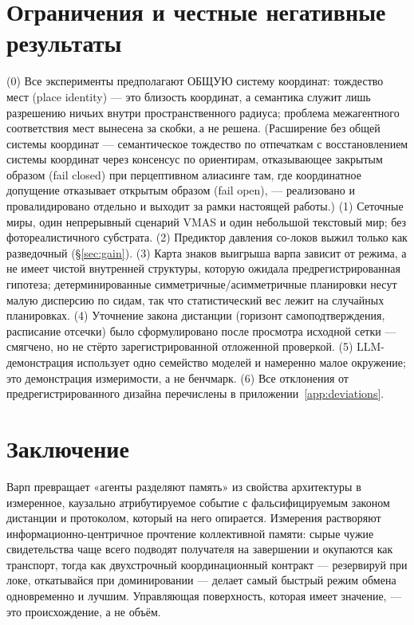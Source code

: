 \documentclass{article}
\begin{document}
\section{Ограничения и честные негативные результаты}
\label{sec:limits}

(0) Все эксперименты предполагают ОБЩУЮ систему координат: тождество
мест (place identity) --- это близость координат, а семантика служит
лишь разрешению ничьих внутри пространственного радиуса; проблема
межагентного соответствия мест вынесена за скобки, а не решена.
(Расширение без общей системы координат --- семантическое тождество
по отпечаткам с восстановлением системы координат через консенсус по
ориентирам, отказывающее закрытым образом (fail closed) при
перцептивном алиасинге там, где координатное допущение отказывает
открытым образом (fail open), --- реализовано и провалидировано
отдельно и выходит за рамки настоящей работы.) (1) Сеточные миры,
один непрерывный сценарий VMAS и один небольшой текстовый мир; без
фотореалистичного субстрата. (2) Предиктор давления со-локов выжил
только как разведочный (\S\ref{sec:gain}). (3) Карта знаков выигрыша
варпа зависит от режима, а не имеет чистой внутренней структуры,
которую ожидала предрегистрированная гипотеза; детерминированные
симметричные/асимметричные планировки несут малую дисперсию по сидам,
так что статистический вес лежит на случайных планировках. (4)
Уточнение закона дистанции (горизонт самоподтверждения, расписание
отсечки) было сформулировано после просмотра исходной сетки ---
смягчено, но не стёрто зарегистрированной отложенной проверкой. (5)
LLM-демонстрация использует одно семейство моделей и намеренно малое
окружение; это демонстрация измеримости, а не бенчмарк. (6) Все
отклонения от предрегистрированного дизайна перечислены в
приложении~\ref{app:deviations}.

\section{Заключение}

Варп превращает «агенты разделяют память» из свойства архитектуры в
измеренное, каузально атрибутируемое событие с фальсифицируемым
законом дистанции и протоколом, который на него опирается. Измерения
растворяют информационно-центричное прочтение коллективной памяти:
сырые чужие свидетельства чаще всего подводят получателя на
завершении и окупаются как транспорт, тогда как двухстрочный
координационный контракт --- резервируй при локе, откатывайся при
доминировании --- делает самый быстрый режим обмена одновременно и
лучшим. Управляющая поверхность, которая имеет значение, --- это
происхождение, а не объём.
\end{document}
